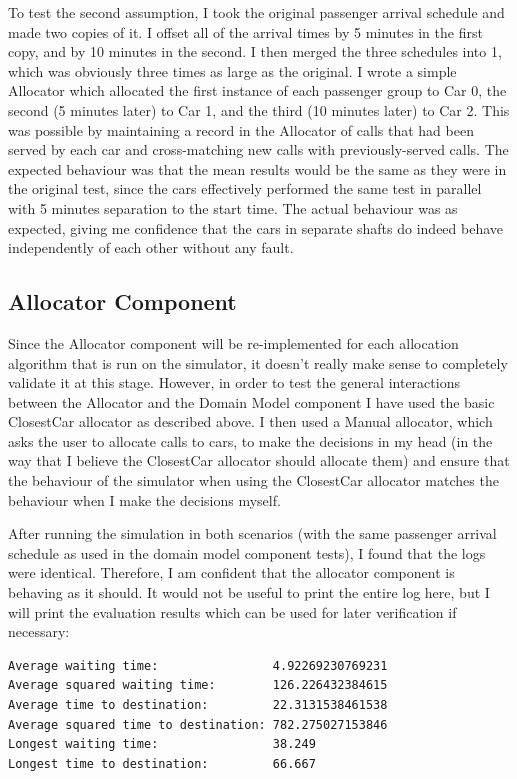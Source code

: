 \documentclass{UoYCSproject}
\begin{document}
To test the second assumption, I took the original passenger arrival schedule and made two copies of it.  I offset all of the arrival times by 5 minutes in the first copy, and by 10 minutes in the second.  I then merged the three schedules into 1, which was obviously three times as large as the original.  I wrote a simple Allocator which allocated the first instance of each passenger group to Car 0, the second (5 minutes later) to Car 1, and the third (10 minutes later) to Car 2.  This was possible by maintaining a record in the Allocator of calls that had been served by each car and cross-matching new calls with previously-served calls.  The expected behaviour was that the mean results would be the same as they were in the original test, since the cars effectively performed the same test in parallel with 5 minutes separation to the start time.  The actual behaviour was as expected, giving me confidence that the cars in separate shafts do indeed behave independently of each other without any fault.

\subsection{Allocator Component}

Since the Allocator component will be re-implemented for each allocation algorithm that is run on the simulator, it doesn't really make sense to completely validate it at this stage.  However, in order to test the general interactions between the Allocator and the Domain Model component I have used the basic ClosestCar allocator as described above.  I then used a Manual allocator, which asks the user to allocate calls to cars, to make the decisions in my head (in the way that I believe the ClosestCar allocator should allocate them) and ensure that the behaviour of the simulator when using the ClosestCar allocator matches the behaviour when I make the decisions myself.

After running the simulation in both scenarios (with the same passenger arrival schedule as used in the domain model component tests), I found that the logs were identical.  Therefore, I am confident that the allocator component is behaving as it should.  It would not be useful to print the entire log here, but I will print the evaluation results which can be used for later verification if necessary:

\begin{lstlisting}
Average waiting time:                4.92269230769231
Average squared waiting time:        126.226432384615
Average time to destination:         22.3131538461538
Average squared time to destination: 782.275027153846
Longest waiting time:                38.249
Longest time to destination:         66.667
\end{lstlisting}
\end{document}
